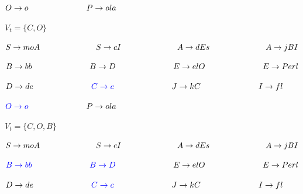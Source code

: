 $ O \rightarrow o\hspace{2.5cm} P \rightarrow ola$ \newline \newline

\newpage

$ V_{t} = \{ C,O \} $ \newline

$ S \rightarrow moA \hspace{2.5cm} S \rightarrow cI \hspace{2.5cm} A \rightarrow  dEs \hspace{2.5cm} A \rightarrow  jBI $ \newline

$ B \rightarrow bb\hspace{2.5cm} B \rightarrow D\hspace{2.5cm} E \rightarrow  elO\hspace{2.5cm} E \rightarrow  Perl$ \newline

$ D \rightarrow de\hspace{2.5cm} \textcolor{blue}{ C \rightarrow c} \hspace{2.5cm} J \rightarrow  kC\hspace{2.5cm} I \rightarrow  fl$ \newline

$ \textcolor{blue}{ O \rightarrow o } \hspace{2.5cm} P \rightarrow ola$ \newline \newline

$ V_{t} = \{ C,O,B \} $ \newline

$ S \rightarrow moA \hspace{2.5cm} S \rightarrow cI \hspace{2.5cm} A \rightarrow  dEs \hspace{2.5cm} A \rightarrow  jBI $ \newline

$ \textcolor{blue}{ B \rightarrow bb } \hspace{2.5cm} \textcolor{blue}{ B \rightarrow D } \hspace{2.5cm} E \rightarrow  elO\hspace{2.5cm} E \rightarrow  Perl$ \newline

$ D \rightarrow de\hspace{2.5cm} \textcolor{blue}{ C \rightarrow c} \hspace{2.5cm} J \rightarrow  kC\hspace{2.5cm} I \rightarrow  fl$ \newline

